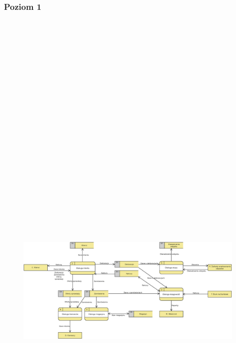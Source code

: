 \subsubsection{Poziom 1}
\clearpage
\begin{figure}[H]
	\centering
	\vspace{-2cm}
	\centerline{\includegraphics[angle=90, height=29cm]{img/DFD/1-level.eps}}
\end{figure}

